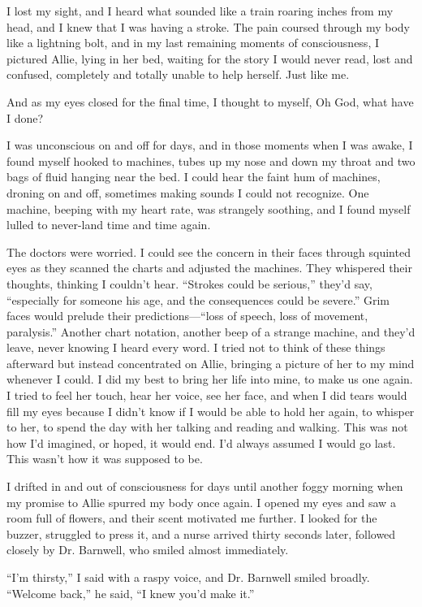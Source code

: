 \documentclass[10pt, twoside, openright]{book}
\begin{document}
I lost my sight, and I heard what sounded like a train roaring inches
from my head, and I knew that I was having a stroke. The pain coursed
through my body like a lightning bolt, and in my last remaining moments
of consciousness, I pictured Allie, lying in her bed, waiting for the
story I would never read, lost and confused, completely and totally
unable to help herself. Just like me.

And as my eyes closed for the final time, I thought to myself, Oh God,
what have I done?

I was unconscious on and off for days, and in those moments when I was
awake, I found myself hooked to machines, tubes up my nose and down my
throat and two bags of fluid hanging near the bed. I could hear the
faint hum of machines, droning on and off, sometimes making sounds I
could not recognize. One machine, beeping with my heart rate, was
strangely soothing, and I found myself lulled to never-land time and
time again.

The doctors were worried. I could see the concern in their faces through
squinted eyes as they scanned the charts and adjusted the machines. They
whispered their thoughts, thinking I couldn't hear. ``Strokes could be
serious,'' they'd say, ``especially for someone his age, and the
consequences could be severe.'' Grim faces would prelude their
predictions---``loss of speech, loss of movement, paralysis.'' Another
chart notation, another beep of a strange machine, and they'd leave,
never knowing I heard every word. I tried not to think of these things
afterward but instead concentrated on Allie, bringing a picture of her
to my mind whenever I could. I did my best to bring her life into mine,
to make us one again. I tried to feel her touch, hear her voice, see her
face, and when I did tears would fill my eyes because I didn't know if I
would be able to hold her again, to whisper to her, to spend the day
with her talking and reading and walking. This was not how I'd imagined,
or hoped, it would end. I'd always assumed I would go last. This wasn't
how it was supposed to be.

I drifted in and out of consciousness for days until another foggy
morning when my promise to Allie spurred my body once again. I opened my
eyes and saw a room full of flowers, and their scent motivated me
further. I looked for the buzzer, struggled to press it, and a nurse
arrived thirty seconds later, followed closely by Dr. Barnwell, who
smiled almost immediately.


``I'm thirsty,'' I said with a raspy voice, and Dr. Barnwell smiled
broadly. ``Welcome back,'' he said, ``I knew you'd make it.''
\end{document}
